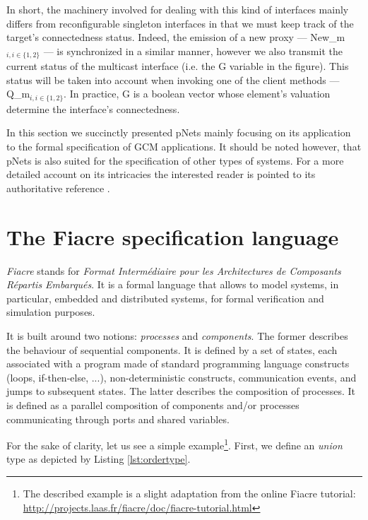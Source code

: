 			\noindent In short, the machinery involved for dealing with this kind of interfaces mainly differs from
		reconfigurable singleton interfaces in that we must keep track of the target's connectedness status. 
		Indeed, the emission of a new proxy --- \textsf{New\_m$_{i, i \in \{1, 2\}}$} --- is synchronized in a similar manner, however
		we also transmit the current status of the multicast interface (i.e. the \textsf{G} variable in the figure).
		This status will be taken into account when invoking one of the client methods --- \textsf{Q\_m$_{i, i \in \{1, 2\}}$}.
		In practice, \textsf{G} is a boolean vector whose element's valuation determine the interface's connectedness. 


		In this section we succinctly presented pNets mainly focusing on its application to the 
		formal specification of \ac{GCM} applications. It should be noted however, that 
		pNets is also suited for the specification of other types of systems.
		For a more detailed account on its intricacies the interested reader is
		pointed to its authoritative reference \cite{BHMS:RRBeh-2012}.
	



\section{The Fiacre specification language}
\label{sec:fiacre}

	\textit{Fiacre} \cite{fiacre2009} stands for 
	\textit{Format Interm\'ediaire pour les Architectures de Composants R\'epartis Embarqu\'es}. 
	It is a formal language that allows to model systems,
	in particular, embedded and distributed systems, for formal verification and 
	simulation purposes.
	
	It is built around two notions: \textit{processes} and \textit{components}. The former
	describes the behaviour of sequential components. It is defined by a set of states,
	each associated with a program made of standard programming language constructs 
	(loops, if-then-else, ...), non-deterministic constructs, communication events, and
	jumps to subsequent states. The latter describes the composition of processes. It is defined
	as a parallel composition of components and/or processes communicating through ports
	and shared variables.

	For the sake of clarity, let us see a simple example\footnote{The described example
	is a slight adaptation from the online Fiacre tutorial: 
	\url{http://projects.laas.fr/fiacre/doc/fiacre-tutorial.html}}. First, we define
	an \textit{union} type as depicted by Listing \ref{lst:ordertype}.
	
